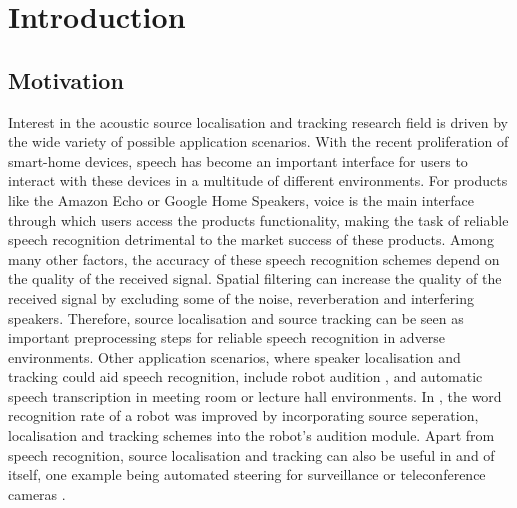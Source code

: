 \chapter{Introduction}

\section{Motivation}
Interest in the acoustic source localisation and tracking research field is driven by the wide variety of possible application scenarios. With the recent proliferation of smart-home devices, speech has become an important interface for users to interact with these devices in a multitude of different environments. For products like the Amazon Echo or Google Home Speakers, voice is the main interface through which users access the products functionality, making the task of reliable speech recognition detrimental to the market success of these products. Among many other factors, the accuracy of these speech recognition schemes depend on the quality of the received signal. Spatial filtering can increase the quality of the received signal by excluding some of the noise, reverberation and interfering speakers. Therefore, source localisation and source tracking can be seen as important preprocessing steps for reliable speech recognition in adverse environments. Other application scenarios, where speaker localisation and tracking could aid speech recognition, include robot audition \cite{Frechette2012}, \cite{Evers2015} and automatic speech transcription in meeting room \cite{Busso2005} or lecture hall \cite{Parviainen2006} environments. In \cite{Frechette2012}, the word recognition rate of a robot was improved by incorporating source seperation, localisation and tracking schemes into the robot's audition module.  Apart from speech recognition, source localisation and tracking can also be useful in and of itself, one example being automated steering for surveillance or teleconference cameras \cite{Wang1997}.



	